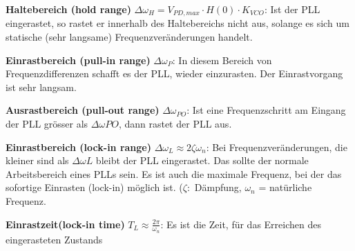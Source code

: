        \begin{compactitem}
          \item \textbf{Haltebereich (hold range)} $\Delta \omega_H = V_{PD,max}\cdot H(0)\cdot K_{VCO}$: Ist der PLL eingerastet, so rastet er innerhalb des Haltebereichs nicht aus, solange es sich um statische (sehr langsame) Frequenzveränderungen handelt. 
          \item \textbf{Einrastbereich (pull-in range)} $\Delta \omega_{P}$: In diesem Bereich von Frequenzdifferenzen schafft es der PLL, wieder einzurasten. Der Einrastvorgang ist sehr langsam.
          \item \textbf{Ausrastbereich (pull-out range)} $\Delta \omega_{PO}$: Ist eine Frequenzschritt am Eingang der PLL grösser als $\Delta\omega PO$, dann rastet der PLL aus.
          \item \textbf{Einrastbereich (lock-in range)} $\Delta \omega_{L} \approx 2 \zeta \omega_n$: Bei Frequenzveränderungen, die kleiner sind als $\Delta \omega L$ bleibt der PLL eingerastet. Das sollte der normale Arbeitsbereich eines PLLs sein. Es ist auch die maximale Frequenz, bei der das sofortige Einrasten (lock-in) möglich ist. ($\zeta:$ Dämpfung, $\omega_n$ = natürliche Frequenz.
          \item \textbf{Einrastzeit(lock-in time)} $T_{L} \approx \frac{2\pi}{\omega _n}$: Es ist die Zeit, für das Erreichen des eingerasteten Zustands 
        \end{compactitem}

\FloatBarrier
